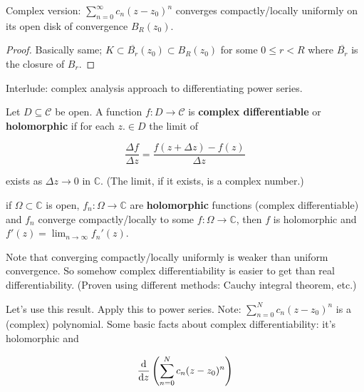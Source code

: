 \begin{theorem}

Complex version: \(\sum_{n=0}^\infty c_n (z - z_0)^n\) converges compactly/locally uniformly on its open disk of convergence \(B_R(z_0)\).

\end{theorem}

\begin{proof}

Basically same; \(K \subset \overline{B_r}(z_0) \subset B_R(z_0)\) for some \(0 \leq r < R\) where \( \overline{B_r}\) is the closure of \(B_r\).

\end{proof}

Interlude: complex analysis approach to differentiating power series.

\begin{definition}

Let \(D \subseteq \mathcal{C}\) be open. A function \(f: D \to \mathcal{C}\) is \textbf{complex differentiable} or \textbf{holomorphic} if for each \(z. \in D\) the limit of

\[
\frac{\Delta f}{\Delta z} = \frac{f(z + \Delta z) - f(z)}{\Delta z}
\]

exists as \(\Delta z \to 0 \) in \(\mathbb{C}\). (The limit, if it exists, is a complex number.)

\end{definition}

\begin{theorem}\label{ra.complex.analysis.thm.diff.power.series}

if \(\Omega \subset \mathbb{C}\) is open, \(f_n: \Omega \to \mathbb{C}\) are \textbf{holomorphic} functions (complex differentiable) and \(f_n\) converge compactly/locally to some \(f: \Omega \to \mathbb{C}\), then \(f\) is holomorphic and \(f'(z) = \lim_{n \to \infty} f_n'(z) \).

\end{theorem}

Note that converging compactly/locally uniformly is weaker than uniform convergence. So somehow complex differentiability is easier to get than real differentiability. (Proven using different methods: Cauchy integral theorem, etc.)

Let's use this result. Apply this to power series. Note: \(\sum_{n=0}^N c_n(z- z_0)^n\) is a (complex) polynomial. Some basic facts about complex differentiability: it's holomorphic and 

\[
\deriv{}{z} \left( \sum_{n=0}^N c_n(z- z_0)^n\right)  
\]

